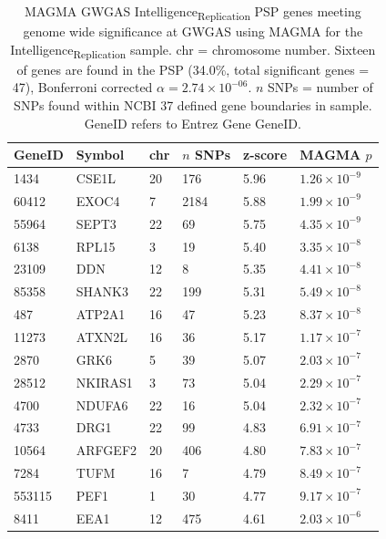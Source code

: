 \begin{table}[ht]
\centering
   \setlength{\extrarowheight}{2pt}
\begin{tabular}{llllll}
  \toprule
 GeneID & Symbol & chr & $n$ SNPs & z-score & MAGMA $p$ \\ 
  \midrule
1434 & CSE1L &  20 & 176 & 5.96 & $1.26 \times 10^{-9}$ \\ 
  60412 & EXOC4 &   7 & 2184 & 5.88 & $1.99 \times 10^{-9}$ \\ 
  55964 & SEPT3 &  22 &  69 & 5.75 & $4.35 \times 10^{-9}$ \\ 
  6138 & RPL15 &   3 &  19 & 5.40 & $3.35 \times 10^{-8}$ \\ 
  23109 & DDN &  12 &   8 & 5.35 & $4.41 \times 10^{-8}$ \\ 
  85358 & SHANK3 &  22 & 199 & 5.31 & $5.49 \times 10^{-8}$ \\ 
  487 & ATP2A1 &  16 &  47 & 5.23 & $8.37 \times 10^{-8}$ \\ 
  11273 & ATXN2L &  16 &  36 & 5.17 & $1.17 \times 10^{-7}$ \\ 
  2870 & GRK6 &   5 &  39 & 5.07 & $2.03 \times 10^{-7}$ \\ 
  28512 & NKIRAS1 &   3 &  73 & 5.04 & $2.29 \times 10^{-7}$ \\ 
  4700 & NDUFA6 &  22 &  16 & 5.04 & $2.32 \times 10^{-7}$ \\ 
  
  4733 & DRG1 &  22 &  99 & 4.83 & $6.91 \times 10^{-7}$ \\ 
  10564 & ARFGEF2 &  20 & 406 & 4.80 & $7.83 \times 10^{-7}$ \\ 
  7284 & TUFM &  16 &   7 & 4.79 & $8.49 \times 10^{-7}$ \\ 
  553115 & PEF1 &   1 &  30 & 4.77 & $9.17 \times 10^{-7}$ \\ 
  8411 & EEA1 &  12 & 475 & 4.61 & $2.03 \times 10^{-6}$ \\ 
   \bottomrule
\end{tabular}
\caption[Intelligence\textsubscript{Replication} Sample Genes in the PSP meeting genome wide significance levels for MAGMA GWGAS] {MAGMA GWGAS Intelligence\textsubscript{Replication} PSP genes meeting genome wide significance at GWGAS using MAGMA for the Intelligence\textsubscript{Replication} sample. chr = chromosome number.  Sixteen of genes are found in the PSP (34.0\%, total significant genes = 47), Bonferroni corrected $\alpha=2.74 \times 10^{-06}$. $n$ SNPs = number of SNPs found within NCBI 37 
defined gene boundaries in sample. GeneID refers to Entrez Gene GeneID.} 
\label{tab:Significant synaptic genes in ctg MAGMA GWAS2}
\end{table}



